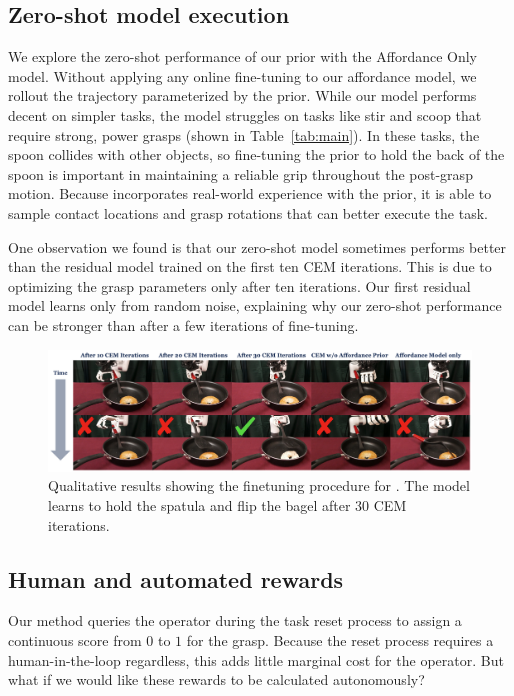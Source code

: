 \subsection{Zero-shot model execution} 
We explore the zero-shot performance of our prior with the Affordance Only model.  Without applying any online fine-tuning to our affordance model, we rollout the trajectory parameterized by the prior.  While our model performs decent on simpler tasks, the model struggles on tasks like stir and scoop that require strong, power grasps (shown in Table~\ref{tab:main}). In these tasks, the spoon collides with other objects, so fine-tuning the prior to hold the back of the spoon is important in maintaining a reliable grip throughout the post-grasp motion. Because \ours incorporates real-world experience with the prior, it is able to sample contact locations and grasp rotations that can better execute the task. 

One observation we found is that our zero-shot model sometimes performs better than the residual model trained on the first ten CEM iterations. This is due to \ours optimizing the grasp parameters only after ten iterations. Our first residual model learns only from random noise, explaining why our zero-shot performance can be stronger than \ours after a few iterations of fine-tuning.


\begin{figure}[t]
\centering
\includegraphics[width=\linewidth]{figs/qual_results.pdf}
\vspace{-0.2in}
  \caption{\small Qualitative results showing the finetuning procedure for \ours.  The model learns to hold the spatula and flip the bagel after 30 CEM iterations. }
 \label{fig:task_bagel}
 \vspace{-0.15in}
\end{figure}


\subsection{Human and automated rewards}
Our method queries the operator during the task reset process to assign a continuous score from $0$ to $1$ for the grasp.  Because the reset process requires a human-in-the-loop regardless, this adds little marginal cost for the operator.  But what if we would like these rewards to be calculated autonomously?  

